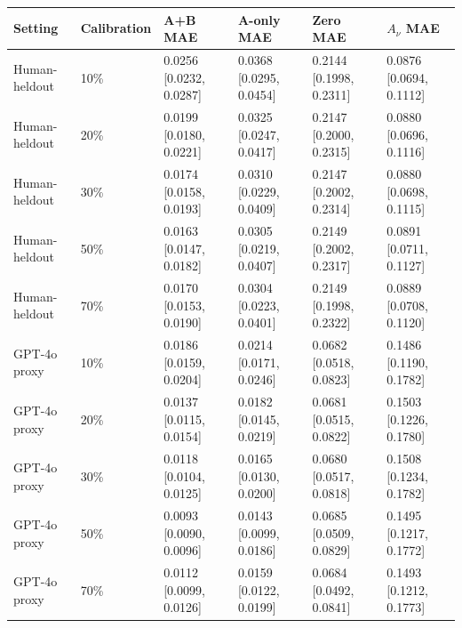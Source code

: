 \begin{tabular}{llllll}
\toprule
Setting & Calibration & A+B MAE & A-only MAE & Zero MAE & $A_\nu$ MAE \\
\midrule
Human-heldout & 10\% & 0.0256 [0.0232, 0.0287] & 0.0368 [0.0295, 0.0454] & 0.2144 [0.1998, 0.2311] & 0.0876 [0.0694, 0.1112] \\
Human-heldout & 20\% & 0.0199 [0.0180, 0.0221] & 0.0325 [0.0247, 0.0417] & 0.2147 [0.2000, 0.2315] & 0.0880 [0.0696, 0.1116] \\
Human-heldout & 30\% & 0.0174 [0.0158, 0.0193] & 0.0310 [0.0229, 0.0409] & 0.2147 [0.2002, 0.2314] & 0.0880 [0.0698, 0.1115] \\
Human-heldout & 50\% & 0.0163 [0.0147, 0.0182] & 0.0305 [0.0219, 0.0407] & 0.2149 [0.2002, 0.2317] & 0.0891 [0.0711, 0.1127] \\
Human-heldout & 70\% & 0.0170 [0.0153, 0.0190] & 0.0304 [0.0223, 0.0401] & 0.2149 [0.1998, 0.2322] & 0.0889 [0.0708, 0.1120] \\
GPT-4o proxy & 10\% & 0.0186 [0.0159, 0.0204] & 0.0214 [0.0171, 0.0246] & 0.0682 [0.0518, 0.0823] & 0.1486 [0.1190, 0.1782] \\
GPT-4o proxy & 20\% & 0.0137 [0.0115, 0.0154] & 0.0182 [0.0145, 0.0219] & 0.0681 [0.0515, 0.0822] & 0.1503 [0.1226, 0.1780] \\
GPT-4o proxy & 30\% & 0.0118 [0.0104, 0.0125] & 0.0165 [0.0130, 0.0200] & 0.0680 [0.0517, 0.0818] & 0.1508 [0.1234, 0.1782] \\
GPT-4o proxy & 50\% & 0.0093 [0.0090, 0.0096] & 0.0143 [0.0099, 0.0186] & 0.0685 [0.0509, 0.0829] & 0.1495 [0.1217, 0.1772] \\
GPT-4o proxy & 70\% & 0.0112 [0.0099, 0.0126] & 0.0159 [0.0122, 0.0199] & 0.0684 [0.0492, 0.0841] & 0.1493 [0.1212, 0.1773] \\
\bottomrule
\end{tabular}
